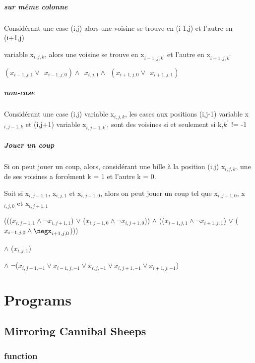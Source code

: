 \documentclass[utf8]{article}
\begin{document}
\subparagraph{sur même colonne}
Considérant une case (i,j) 
alors une voisine se trouve en (i-1,j) 
et l'autre en (i+1,j) 

variable x$_{i,j,k}$, 
alors une voisine se trouve en x$_{i-1,j,k^\prime}$ et l'autre en x$_{i+1,j,k^{\prime\prime}}$

$(x_{i-1,j,1} \lor ~~ x_{i-1,j,0} )
\land ~~
x_{i,j,1}
\land ~~
(x_{i+1,j,0} \lor ~~ x_{i+1,j,1})$

\subparagraph{non-case}
Considérant une case (i,j)
variable 
x$_{i,j,k}$, 
les cases aux positions 
(i,j-1) variable x$_{i,j-1,k}$ 
et (i,j+1) variable x$_{i,j+1,k^\prime}$, 
sont des voisines
si et seulement si k,$k^ {\prime}$ != -1

\subparagraph{Jouer un coup}
Si on peut jouer un coup, alors, 
considérant une bille à la position (i,j) x$_{i,j,k}$, 
une de ses voisines
a forcément k = 1 et l'autre k = 0.\newline

Soit si x$_{i,j-1,1}$, x$_{i,j,1}$ et x$_{i,j+1,0}$, alors on peut jouer un coup tel que x$_{i,j-1,0}$, x$_{i,j,0}$ et x$_{i,j+1,1}$
\newline

\begin{clips-code}
    ((($x_{i,j-1,1} \land \neg x_{i,j+1,1}$) $\lor$ ($ x_{i,j-1,0} \land \neg x_{i,j+1,0}$)) $\land$ (($x_{i-1,j,1} \land \neg x_{i+1,j,1}$) $\lor$ ($ x_{i-1,j,0} \land \negx_{i+1,j,0}$)))
    
    $\land$ ($x_{i,j,1}$) 

    $\land$ $\neg$($ x_{i,j-1,-1} \lor x_{i-1,j,-1} \lor x_{i,j,-1} \lor x_{i,j+1,-1} \lor x_{i+1,j,-1}$)


\end{clips-code}

\newpage

\section{Programs}

\subsection{ Mirroring Cannibal Sheeps }

\subsubsection{function}
\end{document}
